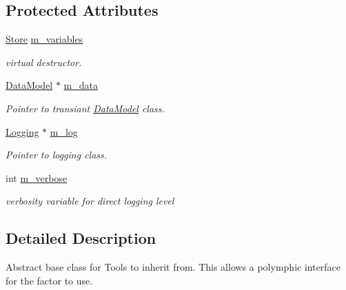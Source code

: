 \subsection*{Protected Attributes}
\begin{DoxyCompactItemize}
\item 
\hyperlink{classStore}{Store} \hyperlink{classTool_a208aed50c1c50212d2927b372c38763f}{m\-\_\-variables}
\begin{DoxyCompactList}\small\item\em virtual destructor. \end{DoxyCompactList}\item 
\hypertarget{classTool_a0c166968759706b4cd07466693cf19d0}{\hyperlink{classDataModel}{Data\-Model} $\ast$ \hyperlink{classTool_a0c166968759706b4cd07466693cf19d0}{m\-\_\-data}}\label{classTool_a0c166968759706b4cd07466693cf19d0}

\begin{DoxyCompactList}\small\item\em Pointer to transiant \hyperlink{classDataModel}{Data\-Model} class. \end{DoxyCompactList}\item 
\hypertarget{classTool_ae769d2a46a51a2ab638b9d9fb1b78cb7}{\hyperlink{classLogging}{Logging} $\ast$ \hyperlink{classTool_ae769d2a46a51a2ab638b9d9fb1b78cb7}{m\-\_\-log}}\label{classTool_ae769d2a46a51a2ab638b9d9fb1b78cb7}

\begin{DoxyCompactList}\small\item\em Pointer to logging class. \end{DoxyCompactList}\item 
\hypertarget{classTool_a49dc4701c181ce95f8ca4699d82f34e5}{int \hyperlink{classTool_a49dc4701c181ce95f8ca4699d82f34e5}{m\-\_\-verbose}}\label{classTool_a49dc4701c181ce95f8ca4699d82f34e5}

\begin{DoxyCompactList}\small\item\em verbosity variable for direct logging level \end{DoxyCompactList}\end{DoxyCompactItemize}


\subsection{Detailed Description}
Abstract base class for Tools to inherit from. This allows a polymphic interface for the factor to use.

